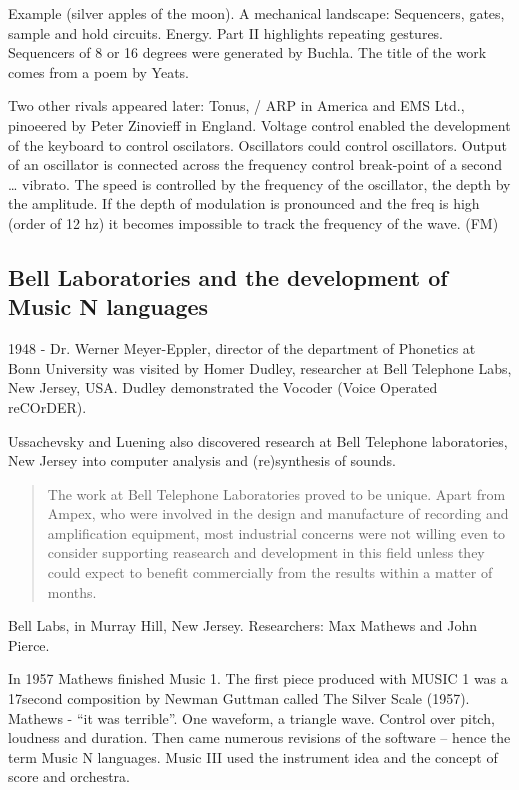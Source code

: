 Example (silver apples of the moon). A mechanical landscape: Sequencers, gates, sample and hold circuits. Energy. Part II highlights repeating gestures. Sequencers of 8 or 16 degrees were generated by Buchla. The title of the work comes from a poem by Yeats.

Two other rivals appeared later: Tonus, / ARP in America and EMS Ltd., pinoeered by Peter Zinovieff in England. Voltage control enabled the development of the keyboard to control oscilators. Oscillators could control oscillators. Output of an oscillator is connected across the frequency control break-point of a second … vibrato. The speed is controlled by the frequency of the oscillator, the depth by the amplitude. If the depth of modulation is pronounced and the freq is high (order of 12 hz) it becomes impossible to track the frequency of the wave. (FM)



\subsection{Bell Laboratories and the development of Music N languages}

1948 - Dr. Werner Meyer-Eppler, director of the department of Phonetics at Bonn University was visited by Homer Dudley, researcher at Bell Telephone Labs, New Jersey, USA. Dudley demonstrated the Vocoder (Voice Operated reCOrDER).

Ussachevsky and Luening also discovered research at Bell Telephone laboratories, New Jersey into computer analysis and (re)synthesis of sounds.

\begin{quotation}
The work at Bell Telephone Laboratories proved to be unique. Apart from Ampex, who were involved in the design and manufacture of recording and amplification equipment, most industrial concerns were not willing even to consider supporting reasearch and development in this field unless they could expect to benefit commercially from the results within a matter of months. \citep[94]{manning2013electronic}
\end{quotation}


Bell Labs, in Murray Hill, New Jersey. Researchers: Max Mathews and John Pierce.

In 1957 Mathews finished Music 1. The first piece produced with MUSIC 1 was a 17second composition by Newman Guttman called The Silver Scale (1957). Mathews - ``it was terrible''. One waveform, a triangle wave. Control over pitch, loudness and duration. Then came numerous revisions of the software – hence the term Music N languages. Music III used the instrument idea and the concept of score and orchestra.

